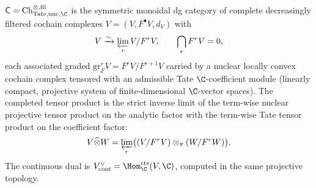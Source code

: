 \begin{defn}
\label{def:completion-host-category}
\(\mathsf C=\mathrm{Ch}^{\otimes,\mathrm{fil}}_{\mathrm{Tate,nuc},\C}\)
is the symmetric monoidal dg category of complete decreasingly
filtered cochain complexes
\(V=(V,F^\bullet V,d_V)\) with
\[
  V\xrightarrow{\sim}\varprojlim_r V/F^r V,
  \qquad
  \bigcap_r F^r V=0,
\]
each associated graded
\(\mathrm{gr}^r_F V=F^r V/F^{r+1}V\) carried by a nuclear locally
convex cochain complex tensored with an admissible Tate
\(\C\)-coefficient module
(linearly compact, projective system of finite-dimensional
\(\C\)-vector spaces).  The completed tensor product is the strict
inverse limit of the term-wise nuclear projective tensor product on
the analytic factor with the term-wise Tate tensor product on the
coefficient factor:
\[
  V\widehat\otimes W
  =\varprojlim_r\bigl((V/F^rV)\otimes_\pi(W/F^rW)\bigr).
\]
The continuous dual is
\(V^\vee_{\mathrm{cont}}=\Hom^{\mathrm{cts}}_\C(V,\C)\), computed in
the same projective topology.
\end{defn}

